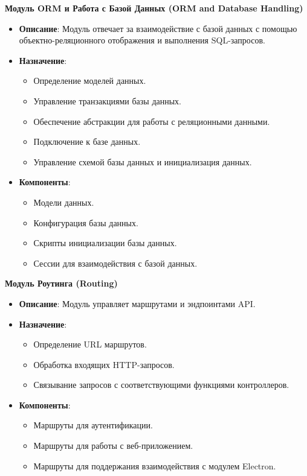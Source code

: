 \documentclass[12pt, russian]{extarticle}
\begin{document}
\begin{spacing}{1.5}
\par \noindent \textbf{Модуль ORM и Работа с Базой Данных (ORM and Database Handling)}
\begin{itemize}
    \item \textbf{Описание}: Модуль отвечает за взаимодействие с базой данных с помощью объектно-реляционного отображения и выполнения SQL-запросов.
    \item \textbf{Назначение}:
    \begin{itemize}
        \item Определение моделей данных.
        \item Управление транзакциями базы данных.
        \item Обеспечение абстракции для работы с реляционными данными.
        \item Подключение к базе данных.
        \item Управление схемой базы данных и инициализация данных.
    \end{itemize}
    \item \textbf{Компоненты}:
    \begin{itemize}
        \item Модели данных.
        \item Конфигурация базы данных.
        \item Скрипты инициализации базы данных.
        \item Сессии для взаимодействия с базой данных.
    \end{itemize}
\end{itemize}

\par \noindent \textbf{Модуль Роутинга (Routing)}
\begin{itemize}
    \item \textbf{Описание}: Модуль управляет маршрутами и эндпоинтами API.
    \item \textbf{Назначение}:
    \begin{itemize}
        \item Определение URL маршрутов.
        \item Обработка входящих HTTP-запросов.
        \item Связывание запросов с соответствующими функциями контроллеров.
    \end{itemize}
    \item \textbf{Компоненты}:
    \begin{itemize}
        \item Маршруты для аутентификации.
        \item Маршруты для работы с веб-приложением.
        \item Маршруты для поддержания взаимодействия с модулем Electron.
    \end{itemize}
\end{itemize}


\end{spacing}
\end{document}
